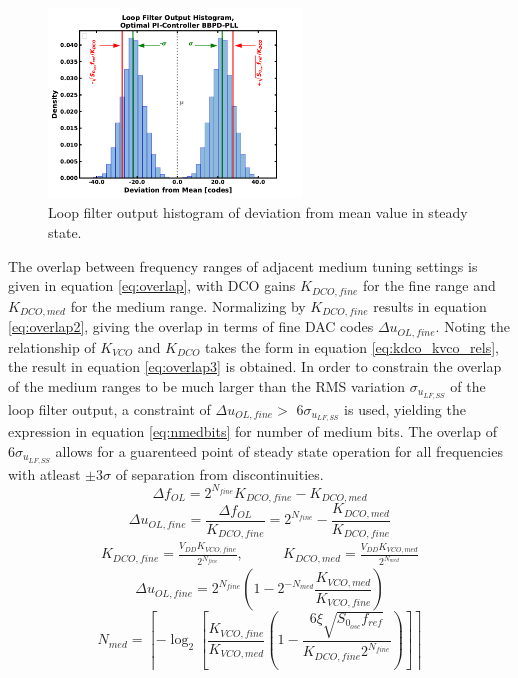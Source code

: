 			\begin{figure}[htb!]
			        \centering
			        \includegraphics[width=0.6\textwidth, angle=0]{./figs/design/lf_out_hist}
			    \caption{Loop filter output histogram of deviation from mean value in steady state.}
			    \label{fig:lf_out_hist}
			\end{figure}
	The overlap between frequency ranges of adjacent medium tuning settings is given in equation \ref{eq:overlap}, with DCO gains $K_{DCO,fine}$ for the fine range and  $K_{DCO,med}$ for the medium range. Normalizing by $K_{DCO,fine}$ results in equation \ref{eq:overlap2}, giving the overlap in terms of fine DAC codes $\Delta u_{OL,fine}$. Noting the relationship of $K_{VCO}$ and $K_{DCO}$ takes the form in equation \ref{eq:kdco_kvco_rels}, the result in equation \ref{eq:overlap3} is obtained. In order to constrain the overlap of the medium ranges to be much larger than the RMS variation $\sigma_{u_{LF,SS}}$ of the loop filter output, a constraint of $\Delta u_{OL,fine} >$ $6 \sigma_{u_{LF,SS}}$ is used, yielding the expression in equation \ref{eq:nmedbits} for number of medium bits. The overlap of $6 \sigma_{u_{LF,SS}}$ allows for a guarenteed point of steady state operation for all frequencies with atleast $\pm 3\sigma$ of separation from discontinuities.
	\begin{equation}\label{eq:overlap}
		\Delta f_{OL} = 2^{N_{fine}}K_{DCO,fine} - K_{DCO,med}
	\end{equation}
	\begin{equation}\label{eq:overlap2}
		\Delta u_{OL,fine} =\frac{\Delta f_{OL}}{K_{DCO,fine}} = 2^{N_{fine}} - \frac{K_{DCO,med}}{K_{DCO,fine}}
	\end{equation}
	\begin{align}\label{eq:kdco_kvco_rels}
		K_{DCO, fine} = \frac{V_{DD}K_{VCO,fine}}{2^{N_{fine}}}, \hspace{2em}& K_{DCO,med} = \frac{V_{DD}K_{VCO,med}}{2^{N_{med}}}
	\end{align}
	\begin{equation}\label{eq:overlap3}
		\Delta u_{OL,fine} = 2^{N_{fine}}\left(1 - 2^{-N_{med}}\frac{K_{VCO,med}}{K_{VCO,fine}}\right)
	\end{equation}
	\begin{equation}\label{eq:nmedbits}
		N_{med} = \left\lceil-\log_2\left[\frac{K_{VCO,fine}}{K_{VCO,med}} \left(1 - \frac{6\xi\sqrt{S_{0_{osc}}f_{ref}}}{K_{DCO,fine}2^{N_{fine}}}\right)\right] \right\rceil
	\end{equation}

